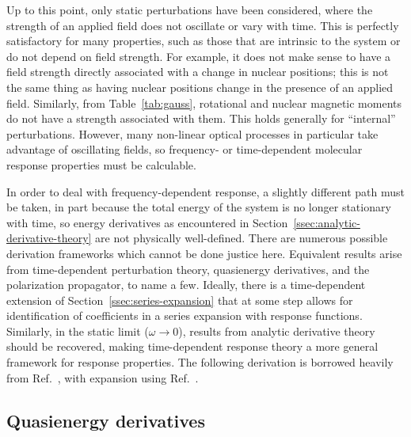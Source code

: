 \documentclass[%
class = book,%
crop = false,%
float = true,%
multi = true,%
preview = false,%
]{standalone}
\begin{document}
Up to this point, only static perturbations have been considered, where the strength of an applied field does not oscillate or vary with time. This is perfectly satisfactory for many properties, such as those that are intrinsic to the system or do not depend on field strength. For example, it does not make sense to have a field strength directly associated with a change in nuclear positions; this is not the same thing as having nuclear positions change in the presence of an applied field. Similarly, from Table~\ref{tab:gauss}, rotational and nuclear magnetic moments do not have a strength associated with them. This holds generally for ``internal'' perturbations. However, many non-linear optical processes in particular take advantage of oscillating fields, so frequency- or time-dependent molecular response properties must be calculable.

In order to deal with frequency-dependent response, a slightly different path must be taken, in part because the total energy of the system is no longer stationary with time, so energy derivatives as encountered in Section~\ref{ssec:analytic-derivative-theory} are not physically well-defined. There are numerous possible derivation frameworks which cannot be done justice here. Equivalent results arise from time-dependent perturbation theory, quasienergy derivatives\cite{Christiansen1998,gauss2000,C1CP21951K,Toulouse2015}, and the polarization propagator\cite{mcweeny1989methods}, to name a few. Ideally, there is a time-dependent extension of Section~\ref{ssec:series-expansion} that at some step allows for identification of coefficients in a series expansion with response functions. Similarly, in the static limit (\(\omega \rightarrow 0\)), results from analytic derivative theory should be recovered, making time-dependent response theory a more general framework for response properties. The following derivation is borrowed heavily from Ref.~\parencite{Toulouse2015}, with expansion using Ref.~\parencite{gauss2000}.

\subsection{Quasienergy derivatives}
\end{document}
